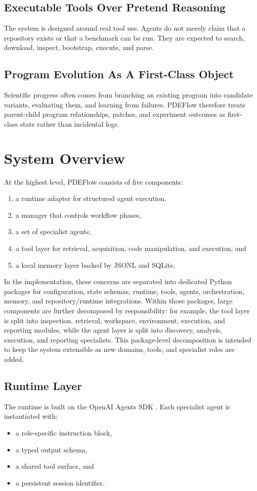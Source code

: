 \documentclass[11pt]{article}
\begin{document}
\subsection{Executable Tools Over Pretend Reasoning}
The system is designed around real tool use. Agents do not merely claim that a repository exists or that a benchmark can be run. They are expected to search, download, inspect, bootstrap, execute, and parse.

\subsection{Program Evolution As A First-Class Object}
Scientific progress often comes from branching an existing program into candidate variants, evaluating them, and learning from failures. PDEFlow therefore treats parent-child program relationships, patches, and experiment outcomes as first-class state rather than incidental logs.

\section{System Overview}
At the highest level, PDEFlow consists of five components:
\begin{enumerate}[leftmargin=1.5em]
  \item a runtime adapter for structured agent execution,
  \item a manager that controls workflow phases,
  \item a set of specialist agents,
  \item a tool layer for retrieval, acquisition, code manipulation, and execution, and
  \item a local memory layer backed by JSONL and SQLite.
\end{enumerate}

In the implementation, these concerns are separated into dedicated Python packages for configuration, state schemas, runtime, tools, agents, orchestration, memory, and repository/runtime integrations. Within those packages, large components are further decomposed by responsibility: for example, the tool layer is split into inspection, retrieval, workspace, environment, execution, and reporting modules, while the agent layer is split into discovery, analysis, execution, and reporting specialists. This package-level decomposition is intended to keep the system extensible as new domains, tools, and specialist roles are added.

\subsection{Runtime Layer}
The runtime is built on the OpenAI Agents SDK \cite{openai_agents_sdk}. Each specialist agent is instantiated with:
\begin{itemize}[leftmargin=1.5em]
  \item a role-specific instruction block,
  \item a typed output schema,
  \item a shared tool surface, and
  \item a persistent session identifier.
\end{itemize}
\end{document}

